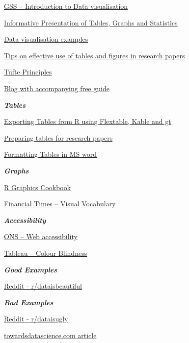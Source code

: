 \documentclass[
]{book}
\begin{document}
\href{https://gss.civilservice.gov.uk/policy-store/introduction-to-data-visualisation/\#section-7}{GSS -- Introduction to Data visualisation}

\href{https://stats4sd.org/resources/412}{Informative Presentation of Tables, Graphs and Statistics}

\href{https://stats4sd.org/resources/59}{Data visualisation examples}

\href{https://www.editage.com/insights/tips-on-effective-use-of-tables-and-figures-in-research-papers}{Tips on effective use of tables and figures in research papers}

\href{https://sites.google.com/site/tufteondesign/home/six-fundamental-principles-of-design}{Tufte Principles}

\href{https://blog.hubspot.com/marketing/great-data-visualization-examples}{Blog with accompanying free guide}

\textbf{\emph{Tables}}

\href{https://stats4sd.org/resources/506}{Exporting Tables from R using Flextable, Kable and gt}

\href{https://www.manuscriptedit.com/scholar-hangout/preparing-tables-research-papers/}{Preparing tables for research papers}

\href{http://www.docs.is.ed.ac.uk/skills/documents/3575/3575.pdf}{Formatting Tables in MS word}

\textbf{\emph{Graphs}}

\href{https://r-graphics.org/}{R Graphics Cookbook}

\href{https://github.com/ft-interactive/chart-doctor/blob/master/visual-vocabulary/Visual-vocabulary.pdf}{Financial Times -- Visual Vocabulary}

\textbf{\emph{Accessibility}}

\href{https://style.ons.gov.uk/writing-for-the-web/web-accessibility/introduction-3/}{ONS -- Web accessibility}

\href{https://www.tableau.com/about/blog/2016/4/examining-data-viz-rules-dont-use-red-green-together-53463}{Tableau -- Colour Blindness}

\textbf{\emph{Good Examples}}

\href{https://www.reddit.com/r/dataisbeautiful/}{Reddit - r/dataisbeautiful}

\textbf{\emph{Bad Examples}}

\href{https://www.reddit.com/r/dataisugly/}{Reddit - r/dataisugly}

\href{https://towardsdatascience.com/why-is-this-chart-bad-5f16da298afa}{towardsdatascience.com article}
\end{document}
